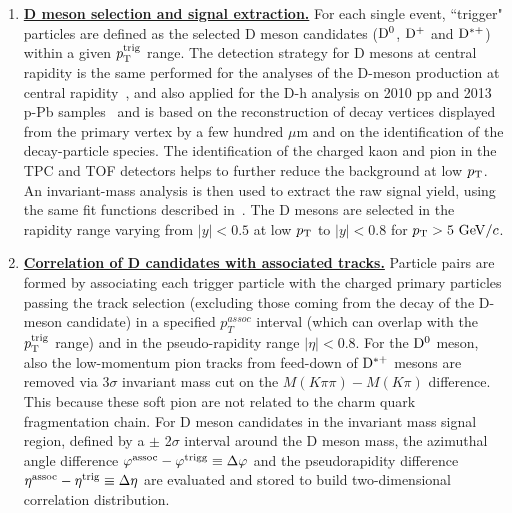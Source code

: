 \begin{enumerate}

\item
\underline {\bf D meson selection and signal extraction.}  For each single event, ``trigger" particles
are defined as the selected  D meson candidates (${\rm D^0}$, ${\rm D^+}$ and ${\rm D^{*+}}$)
within a given $p_{\rm T}^{\rm trig}$ range. The detection strategy for D mesons at central rapidity is
the same performed for the analyses of the D-meson production at central rapidity~\cite{ALICEDmespp7Tev}, and also applied for the D-h analysis on 2010 pp and 2013 p-Pb samples~\cite{ALICEDhcorr} and is based on the reconstruction of decay
vertices displayed from the primary vertex by a few hundred $\mu$m and on the identification of the decay-particle species.
The identification of the charged kaon and pion in the TPC and TOF
detectors helps to further reduce the background at low $p_{\rm T}$.  An
invariant-mass analysis is then used to extract the raw signal yield, using
the same fit functions described in~\cite{ALICEDhcorr}.
The D mesons are selected in the rapidity range varying from $|y|<0.5$ at low $p_{\rm T}$ to $|y|<0.8$ for $p_{\rm T}>5~\mathrm{GeV}/c$. %

\item
\underline{\bf Correlation of D candidates with associated tracks.}
Particle pairs are formed by associating each trigger particle with
the charged primary particles passing the track selection (excluding those coming from the decay of the D-meson candidate) in a specified $p^{assoc}_{T}$
interval (which can overlap with the $p_{\rm T}^{\rm trig}$ range) and in the pseudo-rapidity range $|\eta|<0.8$. For the ${\rm D^0}$ meson, also the low-momentum pion tracks from feed-down of ${\rm D^{*+}}$ mesons are removed via 3$\sigma$ invariant mass cut on the $M(K\pi\pi)-M(K\pi)$ difference. This because these soft pion are not related to the charm quark fragmentation chain.
For D meson candidates in the invariant mass signal region, defined by a $\pm$ 2$\sigma$ interval around the D meson mass, the azimuthal angle difference $\varphi^{\rm assoc}-\varphi^{\rm trigg}\equiv\Delta\varphi$
and the pseudorapidity difference $\eta^{\rm assoc}-\eta^{\rm trig}\equiv\Delta \eta$ are evaluated and stored to build two-dimensional correlation distribution. %


\end{enumerate}
